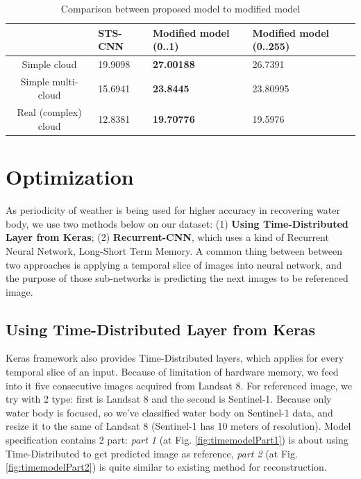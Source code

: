 \begin{table}[h!]
	\centering
	\begin{tabularx}{\textwidth}{|c|Y|Y|Y|}
		\hline
		& STS-CNN & Modified model (0..1) & Modified model (0..255) \\ \hline
		Simple cloud         & 19.9098 & \textbf{27.00188}                                                & 26.7391                                                            \\ \hline
		Simple multi-cloud   & 15.6941 & \textbf{23.8445}                                                 & 23.80995                                                           \\ \hline
		Real (complex) cloud & 12.8381 & \textbf{19.70776}                                                & 19.5976                                                            \\ \hline
	\end{tabularx}
	\caption{Comparison between proposed model to modified model}
\end{table}

\section{Optimization}

As periodicity of weather is being used for higher accuracy in recovering water body, we use two methods below on our dataset: (1) \textbf{Using Time-Distributed Layer from Keras}; (2) \textbf{Recurrent-CNN}, which uses a kind of Recurrent Neural Network, Long-Short Term Memory. A common thing between between two approaches is applying a temporal slice of images into neural network, and the purpose of those sub-networks is predicting the next images to be referenced image. 

\subsection{Using Time-Distributed Layer from Keras}

Keras framework also provides Time-Distributed layers, which applies for every temporal slice of an input. Because of limitation of hardware memory, we feed into it five consecutive images acquired from Landsat 8. For referenced image, we try with 2 type: first is Landsat 8 and the second is Sentinel-1. Because only water body is focused, so we've classified water body on Sentinel-1 data, and resize it to the same of Landsat 8 (Sentinel-1 has 10 meters of resolution). Model specification contains 2 part: \textit{part 1}  (at Fig. \ref{fig:timemodelPart1}) is about using Time-Distributed to get predicted image as reference, \textit{part 2} (at Fig. \ref{fig:timemodelPart2}) is quite similar to existing method for reconstruction.

